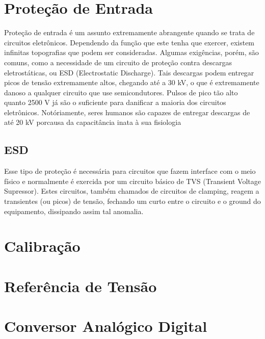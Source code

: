 \section{Proteção de Entrada}\label{sec:InputProtection}

Proteção de entrada é um assunto extremamente abrangente quando se trata de circuitos eletrônicos. Dependendo da função que este tenha que exercer, existem infinitas topografias que podem ser consideradas. Algumas exigências, porém, são comuns, como a necessidade de um circuito de proteção contra descargas eletrostáticas, ou ESD (Electrostatic Discharge). Tais descargas podem entregar picos de tensão extremamente altos, chegando até a 30 kV, o que é extremamente danoso a qualquer circuito que use semicondutores. Pulsos de pico tão alto quanto 2500 V já são o suficiente para danificar a maioria dos circuitos eletrônicos. Notóriamente, seres humanos são capazes de entregar descargas de até 20 kV porcausa da capacitância inata à sua fisiologia %



\subsection{ESD}\label{subsec:electrostaticDischarge}

Esse tipo de proteção é necessária para circuitos que fazem interface com o meio físico e normalmente é exercida por um circuito básico de TVS (Transient Voltage Supressor). Estes circuitos, também chamados de circuitos de clamping, reagem a transientes (ou picos) de tensão, fechando um curto entre o circuito e o ground do equipamento, dissipando assim tal anomalia.

\section{Calibração}\label{sec:OpenLoopCalibration}

\section{Referência de Tensão}\label{sec:VoltageReference}

\section{Conversor Analógico Digital}\label{sec:ADC}

